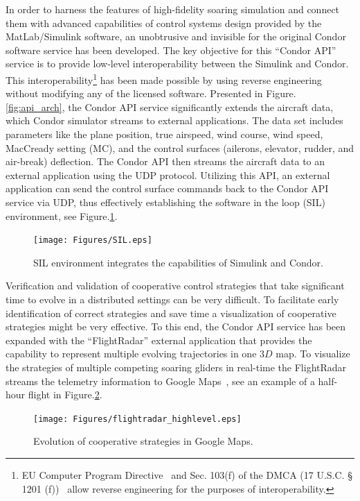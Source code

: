 \documentclass[letterpaper, 10 pt, conference]{ieeeconf}  %
\begin{document}
In order to harness the features of high-fidelity soaring simulation and connect them with advanced capabilities of control systems design provided by the MatLab/Simulink software, an unobtrusive and invisible for the original Condor software service has been developed. The key objective for this ``Condor API'' service is to provide low-level interoperability between the Simulink and Condor. This interoperability\footnote{EU Computer Program Directive~\cite{EU_CPD:2009:Online} and Sec. 103(f) of the DMCA (17 U.S.C. § 1201 (f))~\cite{DMCA:2013:Online} allow reverse engineering for the purposes of interoperability.} has been made possible by using reverse engineering without modifying any of the licensed software. Presented in Figure.\ref{fig:api_arch}, the Condor API service significantly extends the aircraft data, which Condor simulator streams to external applications. The data set includes parameters like the plane position, true airspeed, wind course, wind speed, MacCready setting (MC), and the control surfaces (ailerons, elevator, rudder, and air-break) deflection. The Condor API then streams the aircraft data to an external application using the UDP protocol. Utilizing this API, an external application can send the control surface commands back to the Condor API service via UDP, thus effectively establishing the software in the loop (SIL) environment, see Figure.\ref{fig:SIL}.
\begin{figure}[thpb]
  \centering
  \texttt{[image: Figures/SIL.eps]}
  \caption{SIL environment integrates the capabilities of Simulink and Condor.}
  \label{fig:SIL}
\end{figure}

Verification and validation of cooperative control strategies that take significant time to evolve in a distributed settings can be very difficult. To facilitate early identification of correct strategies and save time a visualization of cooperative strategies might be very effective. To this end, the Condor API service has been expanded with the ``FlightRadar'' external application that provides the capability to represent multiple evolving trajectories in one $3D$ map. To visualize the strategies of multiple competing soaring gliders in real-time the FlightRadar streams the telemetry information to Google Maps~\cite{GoogleMaps:2013:Online}, see an example of a half-hour flight in Figure.\ref{fig:FlightRadar}.
\begin{figure}[thpb]
  \centering
  \texttt{[image: Figures/flightradar\_highlevel.eps]}
  \caption{Evolution of cooperative strategies in Google Maps.}
  \label{fig:FlightRadar}
\end{figure}
\end{document}
